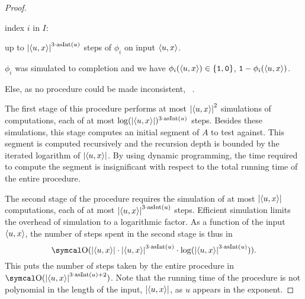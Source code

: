 \begin{proof}
\begin{codelisting}
\begin{codelisting}
    \item
       index $i$ in $I$:
      \begin{codelisting}
      \item
         up to $\length{\pair{u}{x}}^{3 \cdot \asNat(u)}$ steps of $\phi_i$ on input $\pair{u}{x}$.
      \item
         $\phi_i$ was simulated to completion and we have $\phi_i(\pair{u}{x}) \in \{\bits{1}, \bits{0}\}$,
        \itemcont {} $\bits{1} - \phi_i(\pair{u}{x})$.
      \end{codelisting}
    \item
      Else, as no procedure could be made inconsistent, ~.
    \end{codelisting}
  \end{codelisting}

  The first stage of this procedure performs at most ${\lvert{\langle u, x\rangle}\rvert}^2$ simulations of computations, each of at most $\log({\lvert{\langle u, x\rangle}\rvert})^{3 \cdot \operatorname{asInt}(u)}$ steps.
  Besides these simulations, this stage computes an initial segment of $A$ to test against.
  This segment is computed recursively and the recursion depth is bounded by the iterated logarithm of ${\lvert{\langle u, x\rangle}\rvert}$.
  By using dynamic programming, the time required to compute the segment is insignificant with respect to the total running time of the entire procedure.

  The second stage of the procedure requires the simulation of at most ${\lvert{\langle u, x\rangle}\rvert}$ computations, each of at most ${\lvert{\langle u, x\rangle}\rvert}^{3 \cdot \operatorname{asInt}(u)}$ steps.
  Efficient simulation \parencite{arora2009computational} limits the overhead of simulation to a logarithmic factor.
  As a function of the input ${\langle u, x\rangle}$, the number of steps spent in the second stage is thus in
  \begin{equation*}
    \bigO(\length{\pair{u}{x}} \cdot \length{\pair{u}{x}}^{3 \cdot \asNat(u)} \cdot \log(\length{\pair{u}{x}}^{3 \cdot \asNat(u)})).
  \end{equation*}
  This puts the number of steps taken by the entire procedure in $\bigO(\length{\pair{u}{x}}^{3 \cdot \asNat(u) + 2})$.
  Note that the running time of the procedure is not polynomial in the length of the input, ${\lvert{\langle u, x\rangle}\rvert}$, as $u$ appears in the exponent.


\end{proof}
